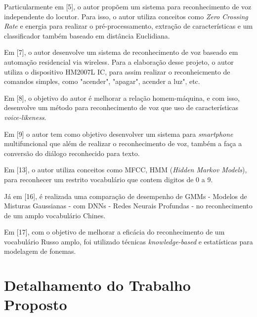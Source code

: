 \documentclass[a4paper,12pt,twoside,openright]{report}
\begin{document}
\par Particularmente em [5], o autor prop\~{o}em um sistema para reconhecimento de voz independente do locutor. Para isso, o autor utiliza conceitos como  \textit{Zero Crossing Rate} e energia para realizar o pr\'{e}-processamento, extra{\c c}\~{a}o de caracter\'{i}sticas e um classificador tamb\'{e}m baseado em dist\^{a}ncia Euclidiana.

\par Em [7], o autor desenvolve um sistema de reconhecimento de voz baseado em automa{\c c}\~{a}o residencial via wireless. Para a elabora{\c c}\~{a}o desse projeto, o autor utiliza o dispositivo HM2007L IC, para assim realizar o reconheicmento de comandos simples, como "acender", "apagar", acender a luz", etc.

\par Em [8], o objetivo do autor \'{e} melhorar a rela{\c c}\~{a}o homem-m\'{a}quina, e com isso, desenvolve um m\'{e}todo para reconhecimento de voz que uso de caracter\'{i}sticas \textit{voice-likeness}.

\par Em [9] o autor tem como objetivo desenvolver um sistema para \textit{smartphone} multifuncional que al\'{e}m de realizar o reconhecimento de voz, tamb\'{e}m a fa{\c c}a a convers\~{a}o do di\'{a}logo reconhecido para texto.

\par Em [13], o autor utiliza conceitos como MFCC, HMM (\textit{Hidden Markov Models}), para reconhecer um restrito vocabul\'{a}rio que contem digitos de 0 a 9.

\par J\'{a} em [16], \'{e} realizada uma compara{\c c}\~{a}o de desempenho de GMMs - Modelos de Misturas Gaussianas - com DNNs - Redes Neurais Profundas - no reconhecimento de um amplo vocabul\'{a}rio Chines. 

\par Em [17], com o objetivo de melhorar a efic\'{a}cia do reconhecimento de um vocabul\'{a}rio Russo amplo, foi utilizado t\'{e}cnicas \textit{knowledge-based} e estat\'{i}sticas para modelagem de fonemas.



\chapter{Detalhamento do Trabalho Proposto}
\label{cap3}
\thispagestyle{myheadings}
\vspace*{-0.3cm}
\end{document}
